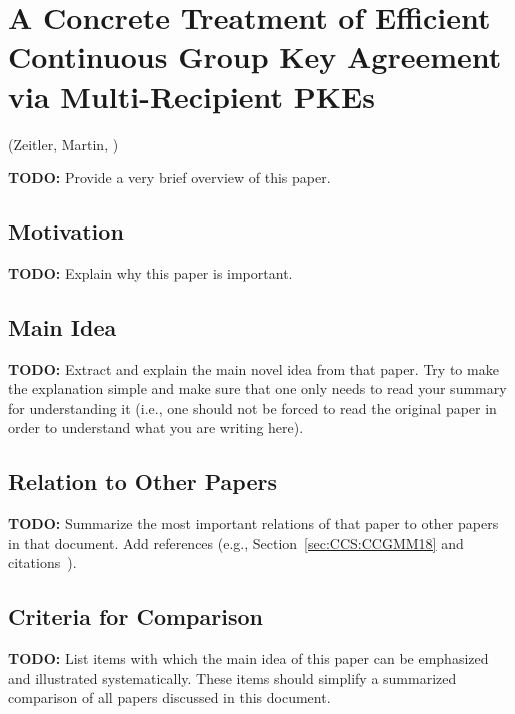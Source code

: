 \section{A Concrete Treatment of Efficient Continuous Group Key Agreement via Multi-Recipient PKEs}
\label{sec:CCS:HKPPW21}
(Zeitler, Martin, \cite{CCS:HKPPW21,EPRINT:HKPPW21})

\alert{\textbf{TODO:} Provide a very brief overview of this paper.}

\subsection{Motivation}
\alert{\textbf{TODO:} Explain why this paper is important.}

\subsection{Main Idea}
\alert{\textbf{TODO:} Extract and explain the main novel idea from that paper. Try to make the explanation simple and make sure that one only needs to read your summary for understanding it (i.e., one should not be forced to read the original paper in order to understand what you are writing here).}

\subsection{Relation to Other Papers}
\alert{\textbf{TODO:} Summarize the most important relations of that paper to other papers in that document. Add references (e.g., Section~\ref{sec:CCS:CCGMM18} and citations~\cite{CCS:CCGMM18}).}

\subsection{Criteria for Comparison}
\alert{\textbf{TODO:} List items with which the main idea of this paper can be emphasized and illustrated systematically. These items should simplify a summarized comparison of all papers discussed in this document.}